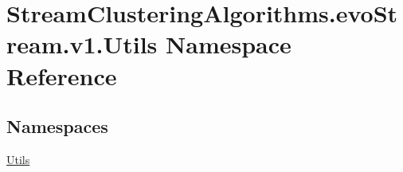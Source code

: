 \hypertarget{namespaceStreamClusteringAlgorithms_1_1evoStream_1_1v1_1_1Utils}{}\section{Stream\+Clustering\+Algorithms.\+evo\+Stream.\+v1.\+Utils Namespace Reference}
\label{namespaceStreamClusteringAlgorithms_1_1evoStream_1_1v1_1_1Utils}
\subsection*{Namespaces}
\begin{DoxyCompactItemize}
\item 
 \hyperlink{namespaceStreamClusteringAlgorithms_1_1evoStream_1_1v1_1_1Utils_1_1Utils}{Utils}
\end{DoxyCompactItemize}
